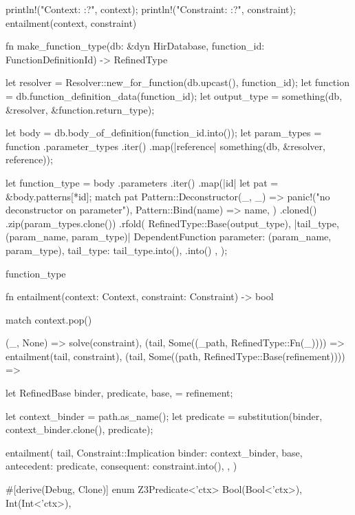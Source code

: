 \documentclass[
  oneside,
  english,
  coorientadorbanca,
  noabntexcite
]{ufsc-thesis-rn46-2019}
\begin{document}
\begin{rustcode}
{    println!("Context: {:?}", context);
    println!("Constraint: {:?}", constraint);
    entailment(context, constraint)
}

fn make_function_type(db: &dyn HirDatabase, function_id: FunctionDefinitionId) -> RefinedType {
    let resolver = Resolver::new_for_function(db.upcast(), function_id);
    let function = db.function_definition_data(function_id);
    let output_type = something(db, &resolver, &function.return_type);

    let body = db.body_of_definition(function_id.into());
    let param_types = function
        .parameter_types
        .iter()
        .map(|reference| something(db, &resolver, reference));

    let function_type = body
        .parameters
        .iter()
        .map(|id| {
            let pat = &body.patterns[*id];
            match pat {
                Pattern::Deconstructor(_, _) => panic!("no deconstructor on parameter"),
                Pattern::Bind(name) => name,
            }
        })
        .cloned()
        .zip(param_types.clone())
        .rfold(
            RefinedType::Base(output_type),
            |tail_type, (param_name, param_type)| {
                DependentFunction {
                    parameter: (param_name, param_type),
                    tail_type: tail_type.into(),
                }
                .into()
            },
        );

    function_type
}

fn entailment(context: Context, constraint: Constraint) -> bool {
    match context.pop() {
        (_, None) => solve(constraint),
        (tail, Some((_path, RefinedType::Fn(_)))) => entailment(tail, constraint),
        (tail, Some((path, RefinedType::Base(refinement)))) => {
            let RefinedBase {
                binder,
                predicate,
                base,
            } = refinement;

            let context_binder = path.as_name();
            let predicate = substitution(binder, context_binder.clone(), predicate);

            entailment(
                tail,
                Constraint::Implication {
                    binder: context_binder,
                    base,
                    antecedent: predicate,
                    consequent: constraint.into(),
                },
            )
        }
    }
}

#[derive(Debug, Clone)]
enum Z3Predicate<'ctx> {
    Bool(Bool<'ctx>),
    Int(Int<'ctx>),
}


\end{rustcode}
\end{document}
